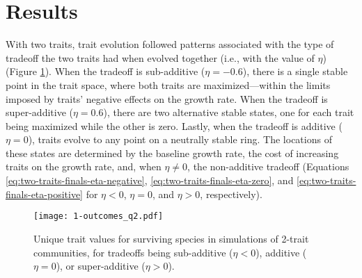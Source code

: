 \section*{Results}


With two traits, trait evolution followed patterns associated with the type 
of tradeoff the two traits had when evolved together
(i.e., with the value of $\eta$)
(Figure \ref{fig:two-trait-outcomes}).
When the tradeoff is sub-additive ($\eta = -0.6$), there is a single
stable point in the trait space, where both traits are
maximized---within the limits imposed by traits' negative effects on 
the growth rate.
When the tradeoff is super-additive ($\eta = 0.6$), there are two
alternative stable states, one for each trait being maximized while the 
other is zero.
Lastly, when the tradeoff is additive ($\eta = 0$), traits
evolve to any point on a neutrally stable ring.
The locations of these states are determined by 
the baseline growth rate, 
the cost of increasing traits on the growth rate,
and, when $\eta \ne 0$, the non-additive tradeoff
(Equations \ref{eq:two-traits-finals-eta-negative},
\ref{eq:two-traits-finals-eta-zero}, and 
\ref{eq:two-traits-finals-eta-positive} for 
$\eta < 0$, $\eta = 0$, and $\eta > 0$, respectively).

\begin{figure}[ht!]
\centering
\texttt{[image: 1-outcomes\_q2.pdf]}
\caption{Unique trait values for surviving species in simulations of 2-trait communities,
    for tradeoffs being sub-additive ($\eta < 0$), additive ($\eta = 0$), or 
    super-additive ($\eta > 0$).}
\label{fig:two-trait-outcomes}
\end{figure}




